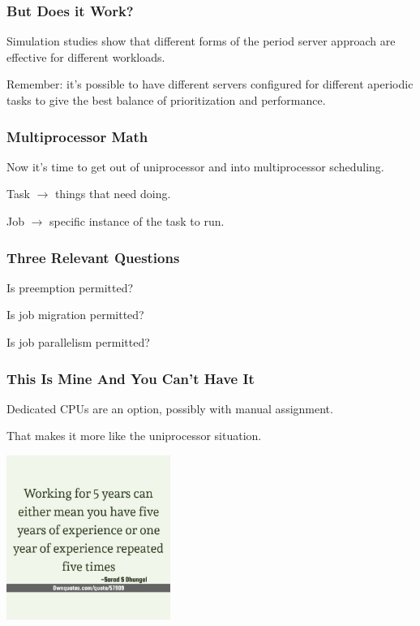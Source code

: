 \begin{frame}
\frametitle{But Does it Work?}

Simulation studies show that different forms of the period server approach are effective for different workloads.

Remember: it's possible to have different servers configured for different aperiodic tasks to give the best balance of prioritization and performance.

\end{frame}

\begin{frame}
\frametitle{Multiprocessor Math}

Now it's time to get out of uniprocessor and into multiprocessor scheduling.

Task $\rightarrow$ things that need doing.

Job $\rightarrow$ specific instance of the task to run.

\end{frame}

\begin{frame}
\frametitle{Three Relevant Questions}

Is preemption permitted?

Is job migration permitted?

Is job parallelism permitted?

\end{frame}

\begin{frame}
\frametitle{This Is Mine And You Can't Have It}

Dedicated CPUs are an option, possibly with manual assignment. 

That makes it more like the uniprocessor situation.

\begin{center}
	\includegraphics[width=0.4\textwidth]{images/yearsofexperience.jpg}
\end{center}

\end{frame}

